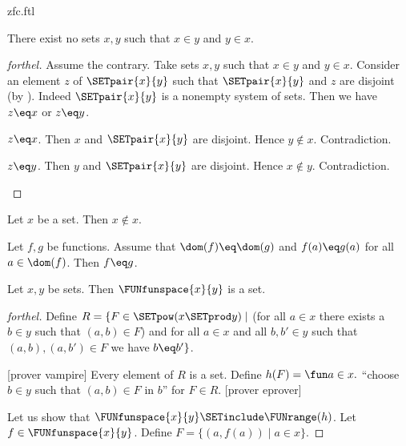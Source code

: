 \documentclass{naproche-library}
\begin{document}
\begin{smodule}[title=ZFC]{zfc.ftl}
\begin{proposition}[forthel,id=FOUNDATIONS_10_8812282138066944]
  There exist no sets $x, y$ such that $x \in y$ and $y \in x$.
\end{proposition}
\begin{proof}[forthel]
  Assume the contrary.
  Take sets $x,y$ such that $x \in y$ and $y \in x$.
  Consider an element $z$ of $\SETpair{x}{y}$ such that $\SETpair{x}{y}$ and $z$ are disjoint (by ).
  Indeed $\SETpair{x}{y}$ is a nonempty system of sets.
  Then we have $z \eq x$ or $z \eq y$.

  \begin{case}{$z \eq x$.}
    Then $x$ and $\SETpair{x}{y}$ are disjoint.
    Hence $y \notin x$.
    Contradiction.
  \end{case}

  \begin{case}{$z \eq y$.}
    Then $y$ and $\SETpair{x}{y}$ are disjoint.
    Hence $x \notin y$.
    Contradiction.
  \end{case}
\end{proof}

\begin{corollary}[forthel,id=FOUNDATIONS_10_3086917813927936]
  Let $x$ be a set.
  Then $x \notin x$.
\end{corollary}

\begin{proposition}[forthel,id=FOUNDATIONS_10_4589652321021547]
  Let $f, g$ be functions.
  Assume that $\dom(f) \eq \dom(g)$ and $f(a) \eq g(a)$ for all $a \in \dom(f)$.
  Then $f \eq g$.
\end{proposition}

\begin{proposition}[forthel,id=FOUNDATIONS_10_4105036244189184]
  Let $x, y$ be sets.
  Then $\FUNfunspace{x}{y}$ is a set.
\end{proposition}
\begin{proof}[forthel]
  Define $R = \{ F \in \SETpow(x \SETprod y) \mid$ (for all $a \in x$ there exists a $b \in y$ such that $(a,b) \in F$) and for all $a \in x$ and all $b, b' \in y$ such that $(a,b), (a,b') \in F$ we have $b \eq b' \}$.

  [prover vampire]
  Every element of $R$ is a set. %
  Define $h(F) = \fun a \in x.$ ``choose $b \in y$ such that $(a,b) \in F$ in $b$'' for $F \in R$.
  [prover eprover]

  Let us show that $\FUNfunspace{x}{y} \SETinclude \FUNrange(h)$.
    Let $f \in \FUNfunspace{x}{y}$.
    Define $F = \{ (a,f(a)) \mid a \in x \}$.


\end{proof}
\end{smodule}
\end{document}
